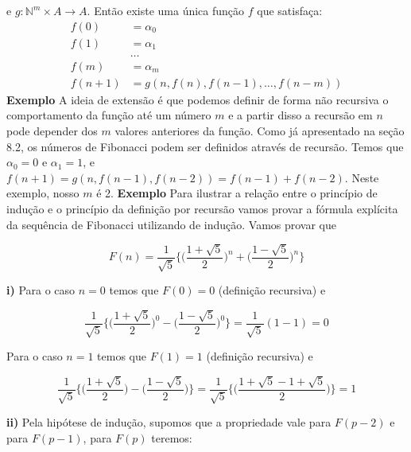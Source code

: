 e $g : \mathbb{N}^m \times A \to A$. Então existe uma única função $f$ que satisfaça:
\begin{align*}
     f(0) &= \alpha_0 \\
     f(1) &= \alpha_1 \\
     &\dots \\
     f(m) &= \alpha_m \\
     f(n+1) &= g(n, f(n), f(n-1), \dots, f(n-m))
\end{align*} 
\textbf{Exemplo} A ideia de extensão é que podemos definir de forma não recursiva o comportamento da
função até um número $m$ e a partir disso a recursão em $n$ pode depender dos $m$ valores anteriores da 
função. Como já apresentado na seção 8.2, os números de Fibonacci podem ser definidos através de 
recursão. Temos que $\alpha_0 = 0$ e $\alpha_1 = 1$, e $f(n+1) = g(n, f(n-1), f(n-2)) = f(n-1) + f(n-2)$. 
Neste exemplo, nosso $m$ é 2.
\newline \textbf{Exemplo} Para ilustrar a relação entre o princípio de indução e o princípio da definição por recursão
vamos provar a fórmula explícita da sequência de Fibonacci utilizando de indução. Vamos provar que
\begin{center}   
\[ F(n) = \frac{1}{\sqrt{5}}\bigg \{ \Big (\frac{1+\sqrt{5}}{2} \Big )^n + \Big (\frac{1-\sqrt{5}}{2}\Big )^n\bigg \}\]
\end{center}
\textbf{i)} Para o caso $n=0$ temos que $F(0) = 0$ (definição recursiva) e
\begin{center}
    \[ \frac{1}{\sqrt{5}}\bigg \{ \Big(\frac{1+\sqrt{5}}{2}\Big)^0 - \Big(\frac{1-\sqrt{5}}{2}\Big)^0 \bigg \} = \frac{1}{\sqrt{5}}(1 - 1) = 0 \]
\end{center}
Para o caso $n=1$ temos que $F(1) = 1$ (definição recursiva) e
\begin{center}
    \[ \frac{1}{\sqrt{5}} \bigg \{ \Big(\frac{1+\sqrt{5}}{2} \Big) - \Big(\frac{1 -\sqrt{5}}{2} \Big)\bigg \} =\frac{1}{\sqrt{5}} \bigg \{ \Big(\frac{1+\sqrt{5} - 1 + \sqrt{5}}{2} \Big)\bigg \} = 1\]
\end{center}
\textbf{ii)} Pela hipótese de indução, supomos que a propriedade vale para $F(p-2)$ e para $F(p-1)$,
para $F(p)$ teremos:
